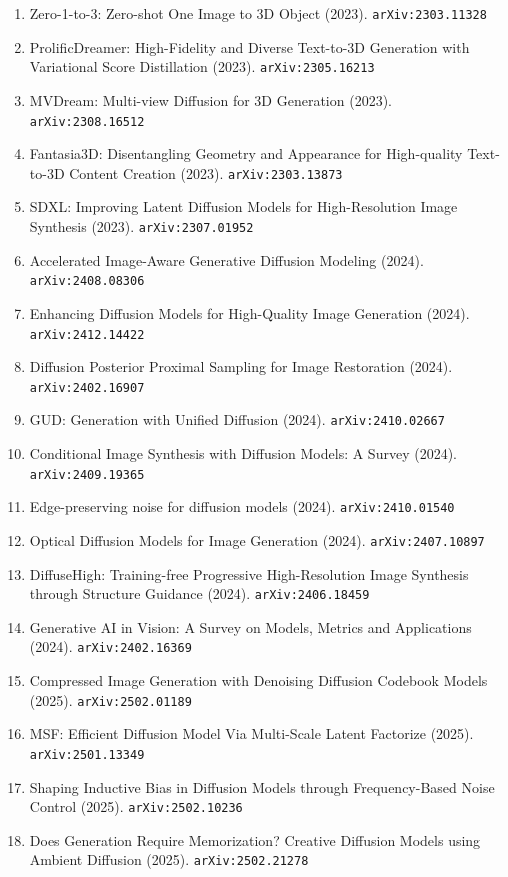 \documentclass[11pt]{article}
\begin{document}
\begin{enumerate}
  \item Zero-1-to-3: Zero-shot One Image to 3D Object (2023). \texttt{arXiv:2303.11328}
  \item ProlificDreamer: High-Fidelity and Diverse Text-to-3D Generation with
  Variational Score Distillation (2023). \texttt{arXiv:2305.16213}
  \item MVDream: Multi-view Diffusion for 3D Generation (2023). \texttt{arXiv:2308.16512}
  \item Fantasia3D: Disentangling Geometry and Appearance for High-quality
  Text-to-3D Content Creation (2023). \texttt{arXiv:2303.13873}
  \item SDXL: Improving Latent Diffusion Models for High-Resolution Image
  Synthesis (2023). \texttt{arXiv:2307.01952}
  \item Accelerated Image-Aware Generative Diffusion Modeling (2024). \texttt{arXiv:2408.08306}
  \item Enhancing Diffusion Models for High-Quality Image Generation (2024). \texttt{arXiv:2412.14422}
  \item Diffusion Posterior Proximal Sampling for Image Restoration (2024). \texttt{arXiv:2402.16907}
  \item GUD: Generation with Unified Diffusion (2024). \texttt{arXiv:2410.02667}
  \item Conditional Image Synthesis with Diffusion Models: A Survey (2024). \texttt{arXiv:2409.19365}
  \item Edge-preserving noise for diffusion models (2024). \texttt{arXiv:2410.01540}
  \item Optical Diffusion Models for Image Generation (2024). \texttt{arXiv:2407.10897}
  \item DiffuseHigh: Training-free Progressive High-Resolution Image Synthesis
  through Structure Guidance (2024). \texttt{arXiv:2406.18459}
  \item Generative AI in Vision: A Survey on Models, Metrics and Applications (2024). \texttt{arXiv:2402.16369}
  \item Compressed Image Generation with Denoising Diffusion Codebook Models (2025). \texttt{arXiv:2502.01189}
  \item MSF: Efficient Diffusion Model Via Multi-Scale Latent Factorize (2025). \texttt{arXiv:2501.13349}
  \item Shaping Inductive Bias in Diffusion Models through Frequency-Based Noise
  Control (2025). \texttt{arXiv:2502.10236}
  \item Does Generation Require Memorization? Creative Diffusion Models using Ambient Diffusion (2025). \texttt{arXiv:2502.21278}

\end{enumerate}
\end{document}
